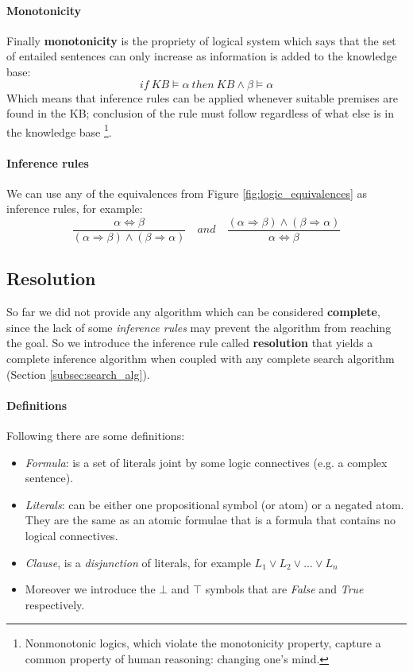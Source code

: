 \documentclass[10pt,a4paper]{article}
\begin{document}
\paragraph{Monotonicity}
Finally \textbf{monotonicity} is the propriety of logical system  which says that the set of entailed sentences can only increase as information is added to the knowledge base:
\[if\ KB\models \alpha\ then \ KB\wedge\beta\models\alpha\]
Which means that inference rules can be applied whenever suitable premises are found in the KB; conclusion of the rule must follow regardless of what else is in the knowledge base \footnote{Nonmonotonic logics, which violate the monotonicity property, capture a common property of human reasoning: changing one's mind.}.

\paragraph{Inference rules}
We can use any of the equivalences from Figure \ref{fig:logic_equivalences} as inference rules, for example:
\[\frac{\alpha \Leftrightarrow \beta }{(\alpha \Rightarrow \beta)\wedge(\beta\Rightarrow\alpha)}\quad and\quad \frac{(\alpha \Rightarrow \beta)\wedge(\beta\Rightarrow\alpha)}{\alpha \Leftrightarrow \beta }\]

\subsection{Resolution}
\label{sec:resolution}
So far we did not provide any algorithm which can be considered \textbf{complete}, since the lack of some \textit{inference rules} may prevent the algorithm from reaching the goal. So we introduce the inference rule called \textbf{resolution} that yields a complete inference algorithm when coupled with any complete search algorithm (Section \ref{subsec:search_alg}).

\paragraph{Definitions}
Following there are some definitions:
\begin{itemize}
\item \textit{Formula}: is a set of literals joint by some logic connectives (e.g. a complex sentence).
\item \textit{Literals}: can be either one propositional symbol (or atom) or a negated atom. They are the same as an atomic formulae that is a formula that contains no logical connectives.
\item \textit{Clause}, is a \textit{disjunction} of literals, for example $L_1\vee L_2\vee...\vee L_n$
\item Moreover we introduce the $\bot$ and $\top$ symbols that are \textit{False} and \textit{True} respectively.

\end{itemize}
\end{document}
